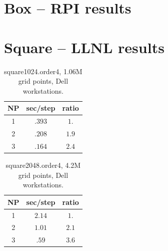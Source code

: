 \documentclass[11pt]{article}
\begin{document}
\section{Box -- RPI results}












\clearpage
\section{Square -- LLNL results}

\begin{table}[hbt]
\begin{center}\footnotesize
\begin{tabular}{|c|c|c|} \hline 
     NP       & sec/step   & ratio \\   \hline\hline 
     1        &  $.393$    & $ 1. $   \\ 
     2        &  $.208$    & $ 1.9$   \\ 
     3        &  $.164$    & $ 2.4$   \\ \hline 
\end{tabular}		
\end{center}		
\caption{square1024.order4, 1.06M grid points, Dell workstations.}
 \label{tab:box} 
\end{table}

\begin{table}[hbt]
\begin{center}\footnotesize
\begin{tabular}{|c|c|c|} \hline 
     NP       & sec/step   & ratio      \\   \hline\hline 
     1        &  $2.14$    & $ 1. $     \\ 
     2        &  $1.01$    & $ 2.1$     \\ 
     3        &  $.59 $    & $ 3.6$     \\ \hline 
\end{tabular}		
\end{center}		
\caption{square2048.order4, 4.2M grid points, Dell workstations.}
 \label{tab:box} 
\end{table}
\end{document}
